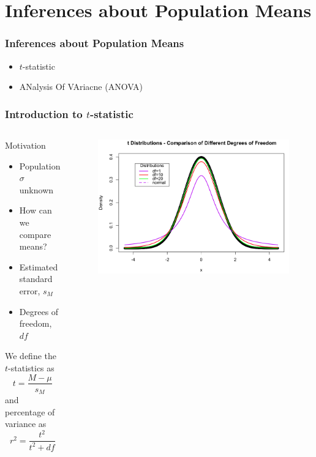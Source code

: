 \documentclass[10pt, compress]{beamer}
\begin{document}
\section{Inferences about Population Means}

\begin{frame}
    \frametitle{Inferences about Population Means}
    \begin{itemize}
        \item $t$-statistic
        \item ANalysis Of VAriacne (ANOVA)
    \end{itemize}
\end{frame}

\begin{frame}
    \frametitle{Introduction to $t$-statistic}
    \begin{columns}
        \begin{block}{Motivation}
            \begin{itemize}
                \item Population $\sigma$ unknown
                \item How can we compare means?
                \item Estimated standard error, $s_M$
                \item Degrees of freedom, $df$
            \end{itemize}
            \smallskip
            We define the $t$-statistics as
            \begin{equation}
                t = \frac{M-\mu}{s_M}
            \end{equation}
            and percentage of variance as
            \begin{equation}
                r^2 = \frac{t^2}{t^2+df}
            \end{equation}
        \end{block}
        \begin{block}{}
            \begin{figure}
                \begin{center}
                    \includegraphics[scale=0.17]{img/2289604_orig.png}

\end{center}
\end{figure}
\end{block}
\end{columns}
\end{frame}
\end{document}
